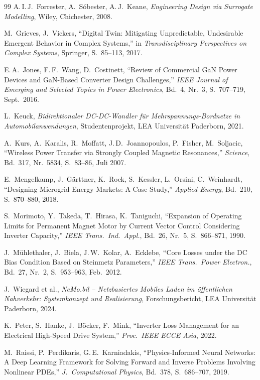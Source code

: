 ﻿\documentclass[a4paper,12pt,openany,oneside]{book}
\theoremstyle{definition}
\begin{document}
\begin{thebibliography}{99}
A.\,I.\,J.~Forrester, A.~S\'obester, A.\,J.~Keane,
\emph{Engineering Design via Surrogate Modelling},
Wiley, Chichester, 2008.

M.~Grieves, J.~Vickers,
``Digital Twin: Mitigating Unpredictable, Undesirable Emergent Behavior
in Complex Systems,''
in \emph{Transdisciplinary Perspectives on Complex Systems},
Springer, S.~85--113, 2017.

E.\,A.~Jones, F.\,F.~Wang, D.~Costinett,
``Review of Commercial GaN Power Devices and GaN-Based Converter
Design Challenges,''
\emph{IEEE Journal of Emerging and Selected Topics in Power Electronics},
Bd.~4, Nr.~3, S.~707--719, Sept.~2016.

L.~Keuck,
\emph{Bidirektionaler DC-DC-Wandler f\"ur Mehrspannungs-Bordnetze
in Automobilanwendungen},
Studentenprojekt, LEA Universit\"at Paderborn, 2021.

A.~Kurs, A.~Karalis, R.~Moffatt, J.\,D.~Joannopoulos,
P.~Fisher, M.~Soljacic,
``Wireless Power Transfer via Strongly Coupled Magnetic Resonances,''
\emph{Science}, Bd.~317, Nr.~5834, S.~83--86, Juli 2007.

E.~Mengelkamp, J.~G\"arttner, K.~Rock, S.~Kessler, L.~Orsini, C.~Weinhardt,
``Designing Microgrid Energy Markets: A Case Study,''
\emph{Applied Energy}, Bd.~210, S.~870--880, 2018.

S.~Morimoto, Y.~Takeda, T.~Hirasa, K.~Taniguchi,
``Expansion of Operating Limits for Permanent Magnet Motor by Current
Vector Control Considering Inverter Capacity,''
\emph{IEEE Trans.\ Ind.\ Appl.}, Bd.~26, Nr.~5, S.~866--871, 1990.

J.~M\"uhlethaler, J.~Biela, J.\,W.~Kolar, A.~Ecklebe,
``Core Losses under the DC Bias Condition Based on Steinmetz Parameters,''
\emph{IEEE Trans.\ Power Electron.}, Bd.~27, Nr.~2, S.~953--963, Feb.~2012.

J.~Wiegard et al.,
\emph{NeMo.bil -- Netzbasiertes Mobiles Laden im \"offentlichen Nahverkehr:
Systemkonzept und Realisierung},
Forschungsbericht, LEA Universit\"at Paderborn, 2024.

K.~Peter, S.~Hanke, J.~B\"ocker, F.~Mink,
``Inverter Loss Management for an Electrical High-Speed Drive System,''
\emph{Proc.\ IEEE ECCE Asia}, 2022.

M.~Raissi, P.~Perdikaris, G.\,E.~Karniadakis,
``Physics-Informed Neural Networks: A Deep Learning Framework for Solving
Forward and Inverse Problems Involving Nonlinear PDEs,''
\emph{J.\ Computational Physics}, Bd.~378, S.~686--707, 2019.


\end{thebibliography}
\end{document}

